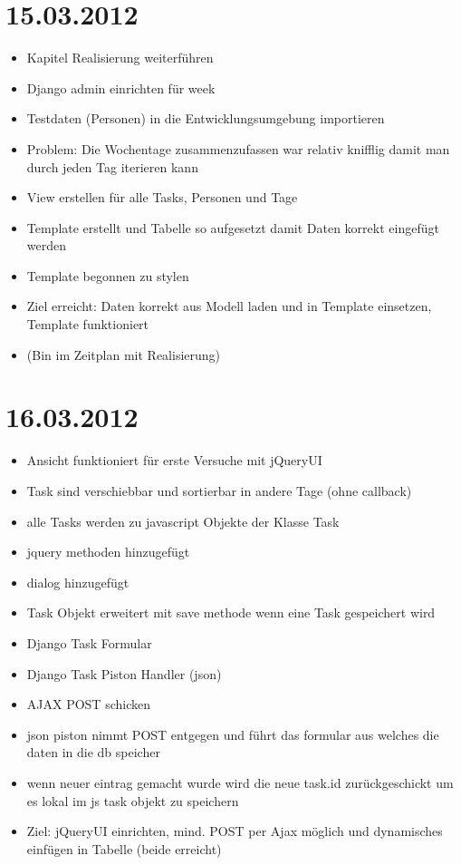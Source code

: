 \section{15.03.2012}
\begin{itemize}
    \item Kapitel Realisierung weiterführen
    \item Django admin einrichten für week
    \item Testdaten (Personen) in die Entwicklungsumgebung importieren
    \item Problem: Die Wochentage zusammenzufassen war relativ knifflig damit man durch jeden Tag iterieren kann
    \item View erstellen für alle Tasks, Personen und Tage
    \item Template erstellt und Tabelle so aufgesetzt damit Daten korrekt eingefügt werden
    \item Template begonnen zu stylen
    \item Ziel erreicht: Daten korrekt aus Modell laden und in Template einsetzen, Template funktioniert
    \item (Bin im Zeitplan mit Realisierung)
\end{itemize}
\section{16.03.2012}
    \begin{itemize}
        \item Ansicht funktioniert für erste Versuche mit jQueryUI
        \item Task sind verschiebbar und sortierbar in andere Tage (ohne callback)
        \item alle Tasks werden zu javascript Objekte der Klasse Task
        \item jquery methoden hinzugefügt
        \item dialog hinzugefügt
        \item Task Objekt erweitert mit save methode wenn eine Task gespeichert wird
        \item Django Task Formular
        \item Django Task Piston Handler (json)
        \item AJAX POST schicken
        \item json piston nimmt POST entgegen und führt das formular aus welches die daten in die db speicher
        \item wenn neuer eintrag gemacht wurde wird die neue task.id zurückgeschickt um es lokal im js task objekt zu speichern
        \item Ziel: jQueryUI einrichten, mind. POST per Ajax möglich und dynamisches einfügen in Tabelle (beide erreicht)
    \end{itemize}
